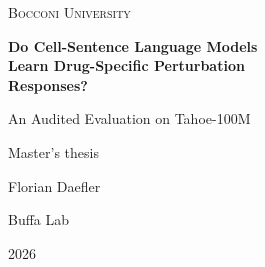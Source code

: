 \begin{titlepage}
  \centering
  \vspace*{1.8cm}
  {\Large\textsc{Bocconi University}\par}
  \vspace{2.4cm}
  {\LARGE\bfseries Do Cell-Sentence Language Models\\[0.35em]
  Learn Drug-Specific Perturbation\\[0.35em]
  Responses?\par}
  \vspace{0.8cm}
  {\Large An Audited Evaluation on Tahoe-100M\par}
  \vfill
  {\large Master's thesis\par}
  \vspace{1.2cm}
  {\Large Florian Daefler\par}
  \vspace{0.45cm}
  {\large Buffa Lab\par}
  \vfill
  {\large 2026\par}
\end{titlepage}
